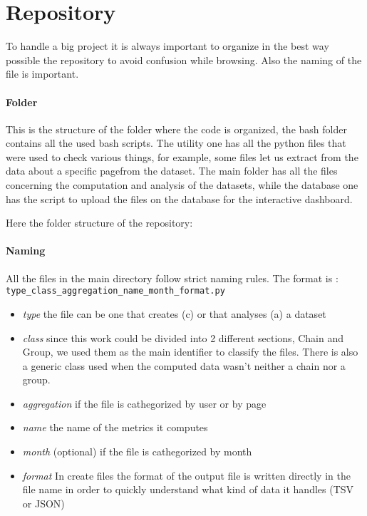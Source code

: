\section{Repository}
To handle a big project it is always important to organize in the best way possible the repository to avoid
confusion while browsing. Also the naming of the file is important.
\paragraph{Folder}
This is the structure of the folder where the code is organized, the bash folder contains all the used bash
scripts. The utility one has all the python files that were used to check various things, for example,
some files let us extract from the data about a specific pagefrom the dataset. The main
folder has all the files concerning the computation and analysis of the datasets, while the
database one has the script to upload the files on the database for the interactive dashboard.

\clearpage
Here the folder structure of the repository:
\paragraph{Naming}
All the files in the main directory follow strict naming rules. The format is : \\
\texttt{type\_class\_aggregation\_name\_month\_format.py}
\begin{itemize}
    \item \textit{type} the file can be one that creates (c) or that analyses (a) a dataset
    \item \textit{class} since this work could be divided into 2 different sections, Chain and Group, we used
    them as the main identifier to classify the files. There is also a generic class used when the computed data
    wasn't neither a chain nor a group.
    \item \textit{aggregation} if the file is cathegorized by user or by page 
    \item \textit{name} the name of the metrics it computes
    \item \textit{month} (optional) if the file is cathegorized by month 
    \item \textit{format} In create files the format of the output file is written directly in the file
    name in order to quickly understand what kind of data it handles (TSV or JSON)
\end{itemize}

